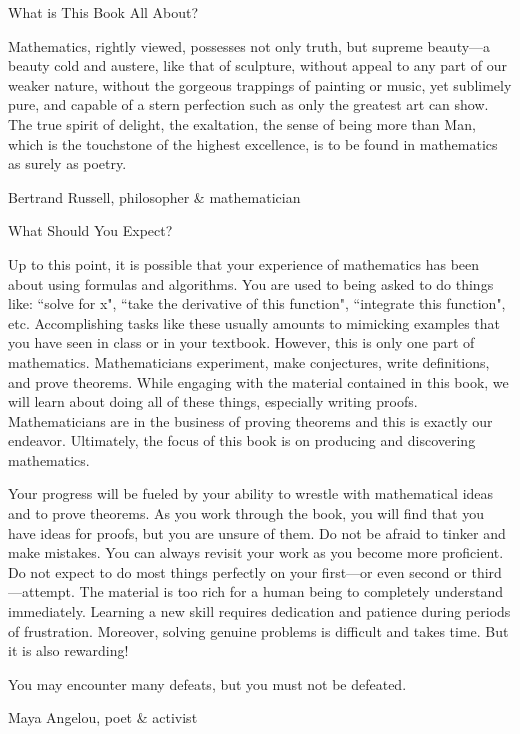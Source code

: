 \begin{section}{What is This Book All About?}
\epigraph{Mathematics, rightly viewed, possesses not only truth, but supreme beauty---a beauty cold and austere, like that of sculpture, without appeal to any part of our weaker nature, without the gorgeous trappings of painting or music, yet sublimely pure, and capable of a stern perfection such as only the greatest art can show. The true spirit of delight, the exaltation, the sense of being more than Man, which is the touchstone of the highest excellence, is to be found in mathematics as surely as poetry.}{Bertrand Russell, philosopher \& mathematician}

\end{section}

\begin{section}{What Should You Expect?}\label{sec:what should you expect}

Up to this point, it is possible that your experience of mathematics has been about using formulas and algorithms. You are used to being asked to do things like: ``solve for x", ``take the derivative of this function", ``integrate this function", etc. Accomplishing tasks like these usually amounts to mimicking examples that you have seen in class or in your textbook. However, this is only one part of mathematics.  Mathematicians experiment, make conjectures, write definitions, and prove theorems.  While engaging with the material contained in this book, we will learn about doing all of these things, especially writing proofs. Mathematicians are in the business of proving theorems and this is exactly our endeavor. Ultimately, the focus of this book is on producing and discovering mathematics.

Your progress will be fueled by your ability to wrestle with mathematical ideas and to prove theorems.  As you work through the book, you will find that you have ideas for proofs, but you are unsure of them.  Do not be afraid to tinker and make mistakes.  You can always revisit your work as you become more proficient. Do not expect to do most things perfectly on your first---or even second or third---attempt. The material is too rich for a human being to completely understand immediately. Learning a new skill requires dedication and patience during periods of frustration. Moreover, solving genuine problems is difficult and takes time. But it is also rewarding! 


\epigraph{You may encounter many defeats, but you must not be defeated.}{Maya Angelou, poet \& activist}
	
\end{section}

